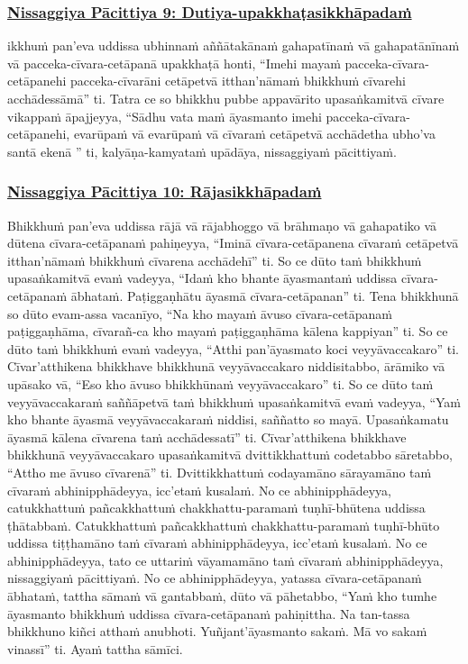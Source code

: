 \subsubsection*{\hyperref[forf-exp9]{Nissaggiya Pācittiya 9: Dutiya-upakkhaṭasikkhāpadaṁ}}
\label{np9}

ikkhuṁ pan'eva uddissa ubhinnaṁ aññātakānaṁ gahapatīnaṁ vā gahapatānīnaṁ vā pacceka-cīvara-cetāpanā upakkhaṭā honti, “Imehi mayaṁ pacceka-cīvara-cetāpanehi pacceka-cīvarāni cetāpetvā itthan'nāmaṁ bhikkhuṁ cīvarehi acchādessāmā” ti. Tatra ce so bhikkhu pubbe appavārito upasaṅkamitvā cīvare vikappaṁ āpajjeyya, “Sādhu vata maṁ āyasmanto imehi pacceka-cīvara-cetāpanehi, evarūpaṁ vā evarūpaṁ vā cīvaraṁ cetāpetvā acchādetha ubho'va santā ekenā ” ti, kalyāṇa-kamyataṁ upādāya, nissaggiyaṁ pācittiyaṁ.

\subsubsection*{\hyperref[forf-exp10]{Nissaggiya Pācittiya 10: Rājasikkhāpadaṁ}}
\label{np10}

Bhikkhuṁ pan'eva uddissa rājā vā rājabhoggo vā brāhmaṇo vā gahapatiko vā dūtena cīvara-cetāpanaṁ pahiṇeyya, “Iminā cīvara-cetāpanena cīvaraṁ cetāpetvā itthan'nāmaṁ bhikkhuṁ cīvarena acchādehī” ti. So ce dūto taṁ bhikkhuṁ upasaṅkamitvā evaṁ vadeyya, “Idaṁ kho bhante āyasmantaṁ uddissa cīvara-cetāpanaṁ ābhataṁ. Paṭiggaṇhātu āyasmā cīvara-cetāpanan” ti. Tena bhikkhunā so dūto evam-assa vacanīyo, “Na kho mayaṁ āvuso cīvara-cetāpanaṁ paṭiggaṇhāma, cīvarañ-ca kho mayaṁ paṭiggaṇhāma kālena kappiyan” ti. So ce dūto taṁ bhikkhuṁ evaṁ vadeyya, “Atthi pan'āyasmato koci veyyāvaccakaro” ti. Cīvar'atthikena bhikkhave bhikkhunā veyyāvaccakaro niddisitabbo, ārāmiko vā upāsako vā, “Eso kho āvuso bhikkhūnaṁ veyyāvaccakaro” ti. So ce dūto taṁ veyyāvaccakaraṁ saññāpetvā taṁ bhikkhuṁ upasaṅkamitvā evaṁ vadeyya, “Yaṁ kho bhante āyasmā veyyāvaccakaraṁ niddisi, saññatto so mayā. Upasaṅkamatu āyasmā kālena cīvarena taṁ acchādessatī” ti. Cīvar'atthikena bhikkhave bhikkhunā veyyāvaccakaro upasaṅkamitvā dvittikkhattuṁ codetabbo sāretabbo, “Attho me āvuso cīvarenā” ti. Dvittikkhattuṁ codayamāno sārayamāno taṁ cīvaraṁ abhinipphādeyya, icc'etaṁ kusalaṁ. No ce abhinipphādeyya, catukkhattuṁ pañcakkhattuṁ chakkhattu-paramaṁ tuṇhī-bhūtena uddissa ṭhātabbaṁ. Catukkhattuṁ pañcakkhattuṁ chakkhattu-paramaṁ tuṇhī-bhūto uddissa tiṭṭhamāno taṁ cīvaraṁ abhinipphādeyya, icc'etaṁ kusalaṁ. No ce abhinipphādeyya, tato ce uttariṁ vāyamamāno taṁ cīvaraṁ abhinipphādeyya, nissaggiyaṁ pācittiyaṁ. No ce abhinipphādeyya, yatassa cīvara-cetāpanaṁ ābhataṁ, tattha sāmaṁ vā gantabbaṁ, dūto vā pāhetabbo, “Yaṁ kho tumhe āyasmanto bhikkhuṁ uddissa cīvara-cetāpanaṁ pahiṇittha. Na tan-tassa bhikkhuno kiñci atthaṁ anubhoti. Yuñjant'āyasmanto sakaṁ. Mā vo sakaṁ vinassī” ti. Ayaṁ tattha sāmīci.


